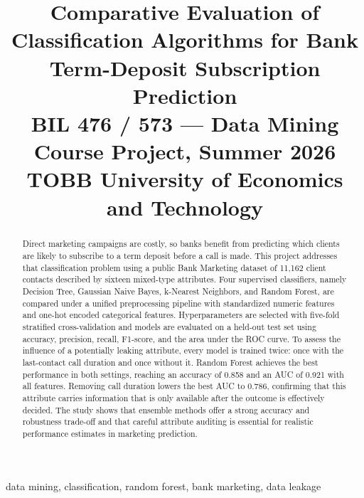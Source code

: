\documentclass[conference]{IEEEtran}
\begin{document}
	\title{Comparative Evaluation of Classification Algorithms for Bank Term-Deposit Subscription Prediction\\
		{\footnotesize BIL 476 / 573 --- Data Mining Course Project, Summer 2026\\
			TOBB University of Economics and Technology}
	}

	\author{
	}

	\maketitle

	\begin{abstract}
		Direct marketing campaigns are costly, so banks benefit from predicting
		which clients are likely to subscribe to a term deposit before a call is
		made. This project addresses that classification problem using a public
		Bank Marketing dataset of 11,162 client contacts described by sixteen
		mixed-type attributes. Four supervised classifiers, namely Decision Tree,
		Gaussian Naive Bayes, k-Nearest Neighbors, and Random Forest, are compared
		under a unified preprocessing pipeline with standardized numeric features
		and one-hot encoded categorical features. Hyperparameters are selected with
		five-fold stratified cross-validation and models are evaluated on a held-out
		test set using accuracy, precision, recall, F1-score, and the area under
		the ROC curve. To assess the influence of a potentially leaking attribute,
		every model is trained twice: once with the last-contact call duration and
		once without it. Random Forest achieves the best performance in both
		settings, reaching an accuracy of 0.858 and an AUC of 0.921 with all
		features. Removing call duration lowers the best AUC to 0.786, confirming
		that this attribute carries information that is only available after the
		outcome is effectively decided. The study shows that ensemble methods offer
		a strong accuracy and robustness trade-off and that careful attribute
		auditing is essential for realistic performance estimates in marketing
		prediction.
	\end{abstract}

	\begin{IEEEkeywords}
		data mining, classification, random forest, bank marketing, data leakage
	\end{IEEEkeywords}
\end{document}
